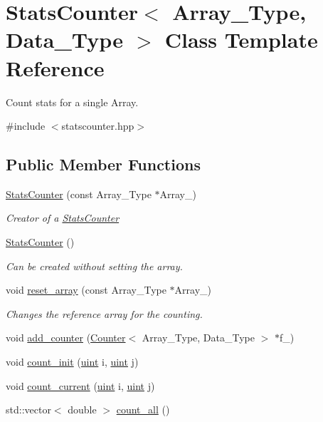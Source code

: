 \hypertarget{class_stats_counter}{}\section{Stats\+Counter$<$ Array\+\_\+\+Type, Data\+\_\+\+Type $>$ Class Template Reference}
\label{class_stats_counter}


Count stats for a single Array.  




{\ttfamily \#include $<$statscounter.\+hpp$>$}

\subsection*{Public Member Functions}
\begin{DoxyCompactItemize}
\item 
\hyperlink{class_stats_counter_aad1531e93d2d217c5cfd6b389ccf6fba}{Stats\+Counter} (const Array\+\_\+\+Type $\ast$Array\+\_\+)
\begin{DoxyCompactList}\small\item\em Creator of a {\ttfamily \hyperlink{class_stats_counter}{Stats\+Counter}} \end{DoxyCompactList}\item 
\hyperlink{class_stats_counter_a6cef1e5bb4914a49ba8dd0f63070f81c}{Stats\+Counter} ()
\begin{DoxyCompactList}\small\item\em Can be created without setting the array. \end{DoxyCompactList}\item 
void \hyperlink{class_stats_counter_a8dabc3a7a9931acbb76900a67d728f70}{reset\+\_\+array} (const Array\+\_\+\+Type $\ast$Array\+\_\+)
\begin{DoxyCompactList}\small\item\em Changes the reference array for the counting. \end{DoxyCompactList}\item 
void \hyperlink{class_stats_counter_a829e41243a7b18cf71337deeec9f7030}{add\+\_\+counter} (\hyperlink{class_counter}{Counter}$<$ Array\+\_\+\+Type, Data\+\_\+\+Type $>$ $\ast$f\+\_\+)
\item 
void \hyperlink{class_stats_counter_a19bd5936619e190c0d8918b4f343922e}{count\+\_\+init} (\hyperlink{typedefs_8hpp_a91ad9478d81a7aaf2593e8d9c3d06a14}{uint} i, \hyperlink{typedefs_8hpp_a91ad9478d81a7aaf2593e8d9c3d06a14}{uint} j)
\item 
void \hyperlink{class_stats_counter_ab81166f7cb67eeaecc469016d237019a}{count\+\_\+current} (\hyperlink{typedefs_8hpp_a91ad9478d81a7aaf2593e8d9c3d06a14}{uint} i, \hyperlink{typedefs_8hpp_a91ad9478d81a7aaf2593e8d9c3d06a14}{uint} j)
\item 
std\+::vector$<$ double $>$ \hyperlink{class_stats_counter_a83bd92031a1499109c98f238221cbd67}{count\+\_\+all} ()
\end{DoxyCompactItemize}
